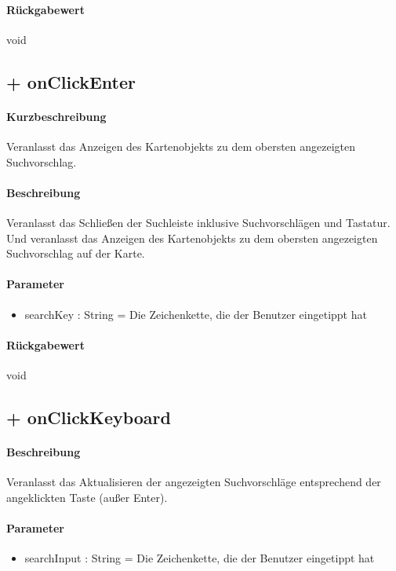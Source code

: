 \paragraph*{Rückgabewert}
void

\subsection{+ onClickEnter}%
\paragraph*{Kurzbeschreibung}
Veranlasst das Anzeigen des Kartenobjekts zu dem obersten angezeigten Suchvorschlag.
\paragraph*{Beschreibung}
Veranlasst das Schließen der Suchleiste inklusive Suchvorschlägen und Tastatur.
Und veranlasst das Anzeigen des Kartenobjekts zu dem obersten angezeigten Suchvorschlag auf der Karte.
\paragraph*{Parameter}
\begin{itemize}
    \item searchKey : String = Die Zeichenkette, die der Benutzer eingetippt hat
\end{itemize}
\paragraph*{Rückgabewert}
void

\subsection{+ onClickKeyboard}%
\paragraph*{Beschreibung}
Veranlasst das Aktualisieren der angezeigten Suchvorschläge entsprechend der angeklickten Taste (außer Enter).
\paragraph*{Parameter}
\begin{itemize}
    \item searchInput : String = Die Zeichenkette, die der Benutzer eingetippt hat
\end{itemize}
